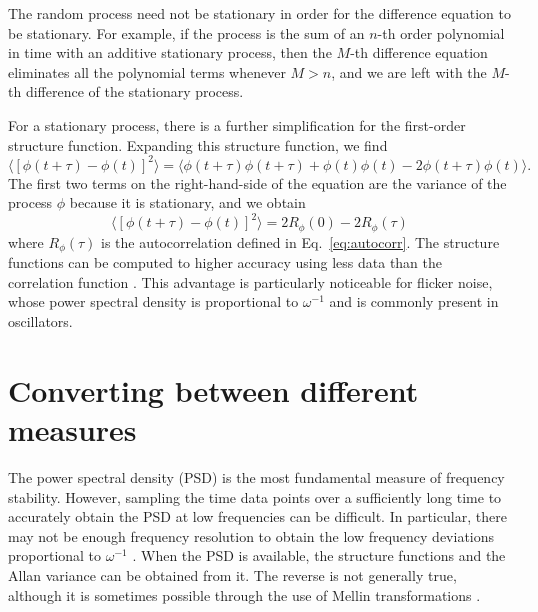 The random process need not be stationary in order for the difference equation to be stationary. For example, if the process is the sum of an $n$-th order polynomial in time with an additive stationary process, then the $M$-th difference equation eliminates all the polynomial terms whenever $M > n$, and we are left with the $M$-th difference of the stationary process. 

For a stationary process, there is a further simplification for the first-order structure function. Expanding this structure function, we find
%
\begin{equation}
\label{eq:structureexpansion}
\langle [\phi(t+\tau) - \phi(t)]^2 \rangle = \langle \phi(t+\tau)\phi(t+\tau) + \phi(t)\phi(t) - 2\phi(t+\tau)\phi(t) \rangle.
\end{equation}
%
The first two terms on the right-hand-side of the equation are the variance of the process $\phi$ because it is stationary, and we obtain
%
\begin{equation}
\label{eq:structuretoautocorr}
\langle [\phi(t+\tau) - \phi(t)]^2 \rangle = 2R_\phi(0) - 2R_\phi(\tau)
\end{equation}
%
where $R_\phi(\tau)$ is the autocorrelation defined in Eq.~\ref{eq:autocorr}. The structure functions can be computed to higher accuracy using less data than the correlation function \cite{Schulz-DuBois1981}. This advantage is particularly noticeable for flicker noise, whose power spectral density is proportional to $\omega^{-1}$ and is commonly present in oscillators.

\section{Converting between different measures} \label{sec:convert}
%
The power spectral density (PSD) is the most fundamental measure of frequency stability. However, sampling the time data points over a sufficiently long time to accurately obtain the PSD at low frequencies can be difficult. In particular, there may not be enough frequency resolution to obtain the low frequency deviations proportional to $\omega^{-1}$ \cite{LohFlicker}. When the PSD is available, the structure functions and the Allan variance can be obtained from it. The reverse is not generally true, although it is sometimes possible through the use of Mellin transformations \cite{Kartaschoff1978, Lindsey1976}.

